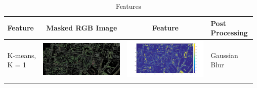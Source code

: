 \documentclass[fleqn,10pt]{SelfArx} %
\begin{document}
\begin{table}
\caption{Features}
\label{tab:features}
\centering
\begin{tabular}{>{\centering\arraybackslash}M{8mm}cc>{\centering\arraybackslash}M{20mm}}
\toprule
Feature & Masked RGB Image & Feature & Post Processing \\ 
\midrule 
\vspace{-3cm}
\hspace{-0.6cm}
K-means, K = 1 & \includegraphics[clip,scale=0.07]{1rgb.jpg} & \includegraphics[trim={6cm 2.5cm 4.5cm 1.6cm},clip,scale=0.18]{1.jpg} & \vspace{-3cm}Gaussian Blur \\ 
\midrule 
\vspace{-3cm}
\hspace{-0.6cm}

\end{tabular}
\end{table}
\end{document}
